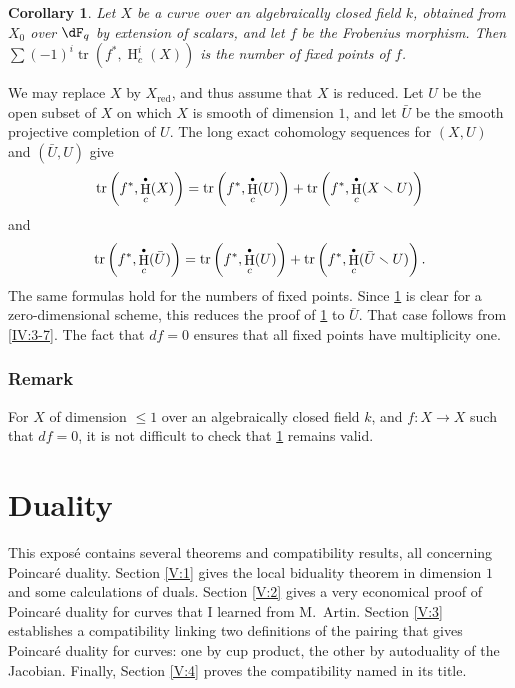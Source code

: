 \documentclass[12pt,oneside,english]{smfbook}
\DeclareMathOperator{\h}{H}
\DeclareMathOperator{\tr}{tr}
\renewcommand{\setminus}{\smallsetminus}
\newtheorem{corollary_}[subsection]{Corollary}
\let\oldbullet\bullet
\renewcommand{\bullet}{\textnormal{\tiny$\oldbullet$}}
\begin{document}
\begin{corollary_}\label{IV:3-8}
Let $X$ be a curve over an algebraically closed field $k$, obtained from $X_0$ over $\dF_q$ by extension of scalars, and let $f$ be the Frobenius morphism. Then $\sum(-1)^i\tr(f^\ast,\h_c^i(X))$ is the number of fixed points of $f$.
\end{corollary_}

We may replace $X$ by $X_\text{red}$, and thus assume that $X$ is reduced. Let $U$ be the open subset of $X$ on which $X$ is smooth of dimension $1$, and let $\bar U$ be the smooth projective completion of $U$. The long exact cohomology sequences for $(X,U)$ and $(\bar U,U)$ give
\[
  \tr\left(f^\ast,\h_c^\bullet(X)\right) = \tr\left(f^\ast,\h_c^\bullet(U)\right) + \tr\left(f^\ast,\h_c^\bullet(X\setminus U)\right)
\]
and
\[
  \tr\left(f^\ast,\h_c^\bullet(\bar U)\right) = \tr\left(f^\ast,\h_c^\bullet(U)\right) + \tr\left(f^\ast,\h_c^\bullet(\bar U\setminus U)\right) \text{.}
\]
The same formulas hold for the numbers of fixed points. Since \ref{IV:3-8} is clear for a zero-dimensional scheme, this reduces the proof of \ref{IV:3-8} to $\bar U$. That case follows from \ref{IV:3-7}. The fact that $df=0$ ensures that all fixed points have multiplicity one.

\subsection{Remark}\label{IV:3-9}

For $X$ of dimension $\leqslant1$ over an algebraically closed field $k$, and $f:X\to X$ such that $df=0$, it is not difficult to check that \ref{IV:3-8} remains valid.
\clearpage
\clearpage
\chapter{Duality}\label{V}

This exposé contains several theorems and compatibility results, all concerning Poincaré duality. Section \ref{V:1} gives the local biduality theorem in dimension $1$ \cite[I.5.1]{sga5} and some calculations of duals. Section \ref{V:2} gives a very economical proof of Poincaré duality for curves that I learned from M.\ Artin. Section \ref{V:3} establishes a compatibility linking two definitions of the pairing that gives Poincaré duality for curves: one by cup product, the other by autoduality of the Jacobian. Finally, Section \ref{V:4} proves the compatibility named in its title.
\end{document}
